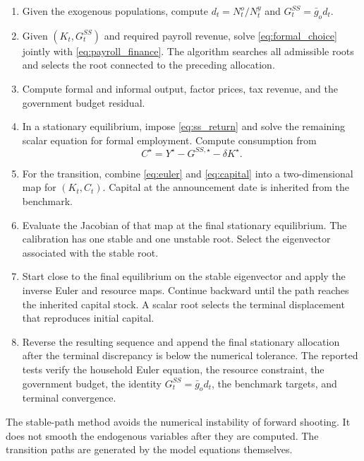 \documentclass[12pt]{article}
\begin{document}
\begin{enumerate}
\item Given the exogenous populations, compute $d_t=N_t^o/N_t^y$ and
$G_t^{SS}=\bar g_o d_t$.

\item Given $(K_t,G_t^{SS})$ and required payroll revenue, solve
\eqref{eq:formal_choice} jointly with
\eqref{eq:payroll_finance}. The algorithm searches all admissible roots and
selects the root connected to the preceding allocation.

\item Compute formal and informal output, factor prices, tax revenue, and the
government budget residual.

\item In a stationary equilibrium, impose
\eqref{eq:ss_return} and solve the remaining scalar equation for formal
employment. Compute consumption from
\[
  C^\star=Y^\star-G^{SS,\star}-\delta K^\star.
\]

\item For the transition, combine \eqref{eq:euler} and
\eqref{eq:capital} into a two-dimensional map for $(K_t,C_t)$. Capital at the
announcement date is inherited from the benchmark.

\item Evaluate the Jacobian of that map at the final stationary equilibrium.
The calibration has one stable and one unstable root. Select the eigenvector
associated with the stable root.

\item Start close to the final equilibrium on the stable eigenvector and apply
the inverse Euler and resource maps. Continue backward until the path reaches
the inherited capital stock. A scalar root selects the terminal displacement
that reproduces initial capital.

\item Reverse the resulting sequence and append the final stationary
allocation after the terminal discrepancy is below the numerical tolerance.
The reported tests verify the household Euler equation, the resource
constraint, the government budget, the identity $G_t^{SS}=\bar g_o d_t$, the
benchmark targets, and terminal
convergence.
\end{enumerate}

The stable-path method avoids the numerical instability of forward shooting.
It does not smooth the endogenous variables after they are computed. The
transition paths are generated by the model equations themselves.
\end{document}
